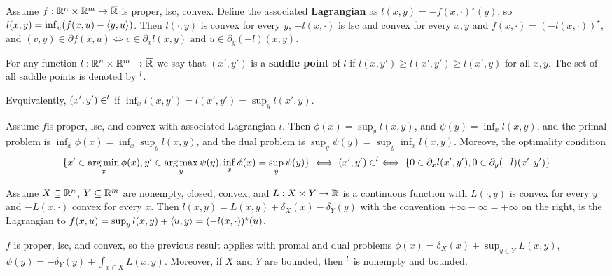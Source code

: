 \begin{thm}
  \label{sec:duality-optimization-8}
  Assume $f: \mathbb{R}^{n} \times \mathbb{R}^{m} \rightarrow \overline {\mathbb{R}}$ is proper,
  lsc, convex.  Define the associated \textbf{Lagrangian} as $l(x, y)
  = -f(x, \cdot)^{\star}(y)$, so $l(x, y) = \inf_{u}(f(x, u) - \IP{y,
    u})$.  Then $l(\cdot, y)$ is convex for every $y$, $-l(x, \cdot)$
  is lsc and convex for every $x, y$ and $f(x, \cdot) = (-l(x,
  \cdot))^{\star}$, and $(v, y) \in \partial f(x, u) \iff v
  \in \partial_{x} l(x, y) \text{ and } u \in \partial_{y}(-l)(x, y)$.
\end{thm}

\begin{defn}
  \label{sec:duality-optimization-9}
  For any function $l: \mathbb{R}^{n} \times \mathbb{R}^{m} \rightarrow \overline {\mathbb{R}}$
  we say that $(x', y')$ is a \textbf{saddle point} of $l$ if $l(x,
  y') \geq l(x', y') \geq l(x', y)$ for all $x, y$. The set of all
  saddle points is denoted by $\sp l$.  

  Evquivalently, $(x', y') \in \sp l$ if $\inf_{x} l(x, y') = l(x',
  y') = \sup_{y} l(x', y)$.
\end{defn}

\begin{thm}
  \label{sec:duality-optimization-10}
  Assume $f$is proper, lsc, and convex with associated Lagrangian $l$.
  Then $\phi(x) = \sup_{y} l(x, y)$, and $\psi(y) = \inf_{x} l(x, y)$,
  and the primal problem is $\inf_{x} \phi(x) = \inf_{x} \sup_{y} l(x,
  y)$, and the dual problem is $\sup_{y} \psi(y) = \sup_{y} \inf_{x}
  l(x, y)$.  Moreove, the optimality condition
  \begin{align}
    \label{eq:49}
    \{ x' \in \operatorname*{arg\,min}_{x} \phi(x), y' \in \operatorname*{arg\,max}_{y} \psi(y),
    \inf_{x} \phi(x) = \sup_{y} \psi(y) \}  \iff (x', y') \in \sp l
    \iff \{ 0 \in \partial_{x} l(x', y'), 0 \in \partial_{y}(-l)(x', y') \} 
  \end{align}
\end{thm}

\begin{thm}
  \label{sec:duality-optimization-11}
  Assume $X \subseteq \mathbb{R}^{n}$, $Y \subseteq \mathbb{R}^{m}$ are nonempty,
  closed, convex, and $L: X \times Y \rightarrow \mathbb{R}$ is a continuous
  function with $L(\cdot, y)$ is convex for every $y$ and $-L(x,
  \cdot)$ convex for every $x$.  Then $l(x, y) = L(x, y) +
  \delta_{X}(x) - \delta_{Y}(y)$ with the convention $+\infty - \infty
  = +\infty$ on the right, is the Lagrangian to $f(x, u) = \sup_{y}
  l(x, y) + \IP{u, y} = (-l(x, \cdot))^{\star}(u)$.

  $f$ is proper, lsc, and convex, so the previous result applies with
  promal and dual problems $\phi(x) = \delta_{X}(x) + \sup_{y \in Y}
  L(x, y)$, $\psi(y) = -\delta_{Y}(y) + \int_{x \in X} L(x, y)$.
  Moreover, if $X$ and $Y$ are bounded, then $\sp l$ is nonempty and bounded.
\end{thm}

